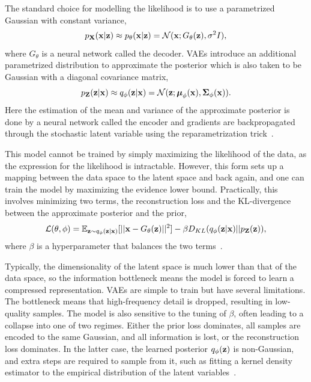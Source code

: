 The standard choice for modelling the likelihood is to use a parametrized Gaussian with constant variance,
\begin{equation}
    p_{\mathbf{X}}(\mathbf{x}|\mathbf{z}) \approx p_{\theta}(\mathbf{x}|\mathbf{z}) = \mathcal{N}(\mathbf{x}; G_{\theta}(\mathbf{z}), \sigma^2 I),
\end{equation}
where $G_{\theta}$ is a neural network called the decoder.
\Glspl{VAE} introduce an additional parametrized distribution to approximate the posterior which is also taken to be Gaussian with a diagonal covariance matrix,
\begin{equation}
    p_{\mathbf{Z}}(\mathbf{z}|\mathbf{x}) \approx q_\phi(\mathbf{z}|\mathbf{x}) = \mathcal{N}(\mathbf{z}; \boldsymbol{\mu}_\phi(\mathbf{x}), \boldsymbol{\Sigma}_\phi(\mathbf{x})).
\end{equation}
Here the estimation of the mean and variance of the approximate posterior is done by a neural network called the encoder and gradients are backpropagated through the stochastic latent variable using the reparametrization trick~\cite{AutoEncodingVariationalBayes}.

This model cannot be trained by simply maximizing the likelihood of the data, as the expression for the likelihood is intractable.
However, this form sets up a mapping between the data space to the latent space and back again, and one can train the model by maximizing the evidence lower bound.
Practically, this involves minimizing two terms, the reconstruction loss and the KL-divergence between the approximate posterior and the prior,
\begin{equation}
    \mathcal{L}(\theta, \phi) = \mathbb{E}_{\mathbf{z} \sim q_{\phi}(\mathbf{z}|\mathbf{x})}[||\mathbf{x} - G_{\theta}(\mathbf{z})||^2] - \beta D_{KL}(q_{\phi}(\mathbf{z}|\mathbf{x}) || p_{\mathbf{Z}}(\mathbf{z})),
\end{equation}
where $\beta$ is a hyperparameter that balances the two terms~\cite{BetaVAE}.

Typically, the dimensionality of the latent space is much lower than that of the data space, so the information bottleneck means the model is forced to learn a compressed representation.
\Glspl{VAE} are simple to train but have several limitations.
The bottleneck means that high-frequency detail is dropped, resulting in low-quality samples.
The model is also sensitive to the tuning of $\beta$, often leading to a collapse into one of two regimes.
Either the prior loss dominates, all samples are encoded to the same Gaussian, and all information is lost, or the reconstruction loss dominates.
In the latter case, the learned posterior $q_\phi(\mathbf{z})$ is non-Gaussian, and extra steps are required to sample from it, such as fitting a kernel density estimator to the empirical distribution of the latent variables~\cite{KDEVAE}.

